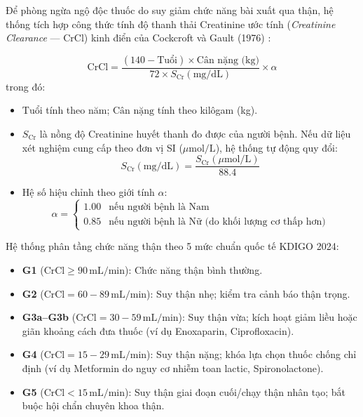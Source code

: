 Để phòng ngừa ngộ độc thuốc do suy giảm chức năng bài xuất qua thận, hệ thống tích hợp công thức tính độ thanh thải Creatinine ước tính (\textit{Creatinine Clearance} --- CrCl) kinh điển của Cockcroft và Gault (1976) \cite{cockcroft_gault_1976}:

\begin{equation}
    \text{CrCl} = \frac{(140 - \text{Tuổi}) \times \text{Cân nặng (kg)}}{72 \times S_{\text{Cr}} (\text{mg/dL})} \times \alpha
\end{equation}
trong đó:
\begin{itemize}[leftmargin=1.5em]
    \item $\text{Tuổi}$ tính theo năm; $\text{Cân nặng}$ tính theo kilôgam (kg).
    \item $S_{\text{Cr}}$ là nồng độ Creatinine huyết thanh đo được của người bệnh. Nếu dữ liệu xét nghiệm cung cấp theo đơn vị SI ($\mu\text{mol/L}$), hệ thống tự động quy đổi:
    \begin{equation}
        S_{\text{Cr}} (\text{mg/dL}) = \frac{S_{\text{Cr}} (\mu\text{mol/L})}{88.4}
    \end{equation}
    \item Hệ số hiệu chỉnh theo giới tính $\alpha$:
    \begin{equation}
        \alpha = \begin{cases} 
        1.00 & \text{nếu người bệnh là Nam} \\
        0.85 & \text{nếu người bệnh là Nữ (do khối lượng cơ thấp hơn)}
        \end{cases}
    \end{equation}
\end{itemize}

Hệ thống phân tầng chức năng thận theo 5 mức chuẩn quốc tế KDIGO 2024:
\begin{itemize}[leftmargin=1.5em]
    \item \textbf{G1} ($\text{CrCl} \ge 90\,\text{mL/min}$): Chức năng thận bình thường.
    \item \textbf{G2} ($\text{CrCl} = 60 - 89\,\text{mL/min}$): Suy thận nhẹ; kiểm tra cảnh báo thận trọng.
    \item \textbf{G3a--G3b} ($\text{CrCl} = 30 - 59\,\text{mL/min}$): Suy thận vừa; kích hoạt giảm liều hoặc giãn khoảng cách đưa thuốc (ví dụ Enoxaparin, Ciprofloxacin).
    \item \textbf{G4} ($\text{CrCl} = 15 - 29\,\text{mL/min}$): Suy thận nặng; khóa lựa chọn thuốc chống chỉ định (ví dụ Metformin do nguy cơ nhiễm toan lactic, Spironolactone).
    \item \textbf{G5} ($\text{CrCl} < 15\,\text{mL/min}$): Suy thận giai đoạn cuối/chạy thận nhân tạo; bắt buộc hội chẩn chuyên khoa thận.
\end{itemize}

